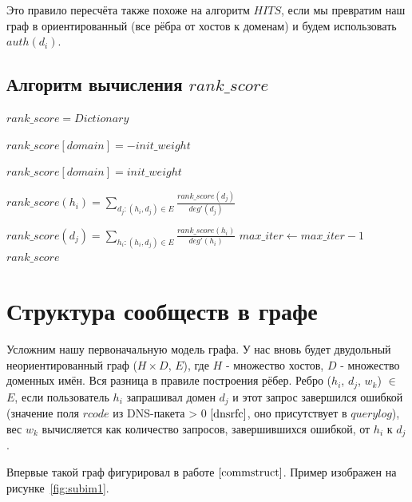 \documentclass[a4paper,14pt]{extreport} %
\begin{document}
Это правило пересчёта также похоже на алгоритм $HITS$, если мы превратим наш граф в ориентированный (все рёбра от хостов к доменам) и будем использовать $auth(d_i)$.
	
\subsection{Алгоритм вычисления $rank\_score$}
\begin{algorithmic}
	\State $rank\_score = Dictionary$
			
	\State $rank\_score[domain] = -init\_weight$
	\EndFor
			
	\State $rank\_score[domain] = init\_weight$
	\EndFor
		
	\State $rank\_score(h_i) = \sum_{d_j: (h_i, d_j)\in E} \frac{rank\_score(d_j)}{deg'(d_j)}$
	\EndFor
				
	\State $rank\_score(d_j) = \sum_{h_i: (h_i, d_j)\in E} \frac{rank\_score(h_i)}{deg'(h_i)}$
	\EndFor
	\State $max\_iter\gets max\_iter-1$
	\EndWhile
	\State \Return $rank\_score$
	\EndFunction
\end{algorithmic}

\section{Структура сообществ в графе}
\label{ssec:communitystruct}
Усложним нашу первоначальную модель графа. У нас вновь будет двудольный неориентированный граф ($H\times D$, $E$), где $H$ - множество хостов, $D$ - множество доменных имён. Вся разница в правиле построения рёбер. Ребро ($h_i$, $d_j$, $w_k$) $\in$ $E$, если пользователь $h_i$ запрашивал домен $d_j$ и этот запрос завершился ошибкой (значение поля $rcode$ из DNS-пакета > 0 $\cite{dnsrfc}$, оно присутствует в $querylog$), вес $w_k$ вычисляется как количество запросов, завершившихся ошибкой, от $h_i$ к $d_j$. 

Впервые такой граф фигурировал в работе $\cite{commstruct}$. Пример изображен на рисунке~\ref{fig:subim1}. 
\end{document}
